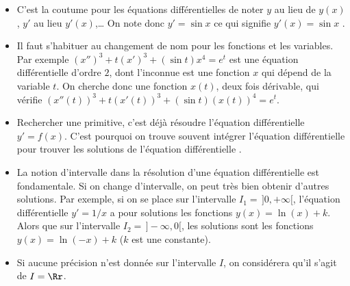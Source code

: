 \documentclass[class=report,crop=false]{standalone}
\begin{document}
\begin{remarque*}
\sauteligne
\begin{itemize}
  \item C'est la coutume pour les équations différentielles de noter $y$ au lieu de $y(x)$,
  $y'$ au lieu $y'(x)$,\ldots
  On note donc \og $y' = \sin x$ \fg{} ce qui signifie \og $y'(x) = \sin x$ \fg.

  \item Il faut s'habituer au changement de nom pour les fonctions et les variables.
  Par exemple $(x'')^3+t(x')^3+(\sin t) x^4=e^t$
  est une équation différentielle d'ordre $2$, dont l'inconnue est
  une fonction $x$ qui dépend de la variable $t$. On cherche donc une fonction $x(t)$,
  deux fois dérivable, qui vérifie $(x''(t))^3+t(x'(t))^3+(\sin t) (x(t))^4=e^t$.

  \item Rechercher une primitive, c'est déjà résoudre l'équation différentielle
  $y'= f(x)$. C'est pourquoi on trouve souvent \og intégrer l'équation différentielle \fg{} 
  pour \og trouver les solutions de l'équation différentielle \fg.


  \item La notion d'intervalle dans la résolution d'une équation différentielle est fondamentale.
  Si on change d'intervalle, on peut très bien obtenir d'autres solutions.
  Par exemple, si on se place sur l'intervalle $I_1 =\,]0, +\infty[$,
  l'équation différentielle $y' = 1/x$ a pour solutions les fonctions $y(x) = \ln(x) + k$.
Alors que sur l'intervalle $I_2 =\,]-\infty, 0[$, les solutions sont les fonctions $y(x) = \ln(-x) + k$
($k$ est une constante).

  \item Si aucune précision n'est donnée sur l'intervalle $I$,
  on considérera qu'il s'agit de $I = \Rr$.
\end{itemize}
\end{remarque*}
\end{document}
